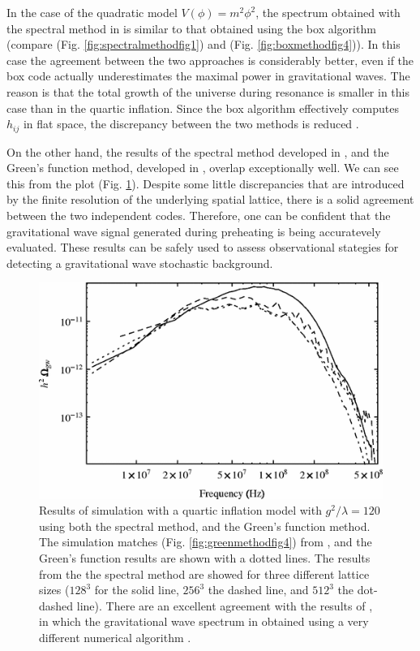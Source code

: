 \documentclass[11pt,a4paper,twoside]{book}
\begin{document}
 In the case of the quadratic model $ V(\phi)=m^{2}\phi^{2} $, the spectrum obtained with the spectral method in \cite{Chap7:SpectralMethod} is similar to that obtained using the box algorithm \cite{Chap7:BoxMethod} (compare (Fig. \ref{fig:spectralmethodfig1}) and (Fig. \ref{fig:boxmethodfig4})). In this case the agreement between the two approaches is considerably better, even if the box code actually underestimates the maximal power in gravitational waves. The reason is that the total growth of the universe during resonance is smaller in this case than in the quartic inflation. Since the box algorithm effectively computes $ h_{ij} $ in flat space, the discrepancy between the two methods is reduced \cite{Chap7:SpectralMethodComparison}.

On the other hand, the results of the spectral method developed in \cite{Chap7:SpectralMethod}, and the Green's function method, developed in \cite{Chap7:GreenMethod}, overlap exceptionally well. We can see this from the plot (Fig. \ref{fig:comparisonfig13}).  Despite some little discrepancies that are introduced by the finite resolution of the underlying spatial lattice, there is a solid agreement between the two independent codes. Therefore, one can be confident that the gravitational wave signal generated during preheating is being accuratevely evaluated. These results can be safely used to assess observational stategies for detecting a gravitational wave stochastic background.
 \begin{figure}[h]
 	\centering
 	\includegraphics[width=0.65\linewidth, height=0.35\textheight]{Images/Chap7/Comparison_Fig13}
 	\caption{Results of simulation with a quartic inflation model with $ g^{2}/\lambda=120 $ using both the spectral method, and the Green's function method. The simulation matches (Fig. \ref{fig:greenmethodfig4}) from \cite{Chap7:GreenMethod}, and the Green's function results are shown with a dotted lines. The results from the the spectral method are showed for three different lattice sizes ($ 128^{3} $ for the solid line, $ 256^{3} $ the dashed line, and $ 512^{3} $ the dot-dashed line). There are an excellent agreement with the results of \cite{Chap7:GreenMethod}, in which the gravitational wave spectrum in obtained using a very different numerical algorithm \cite{Chap7:SpectralMethodComparison}.}
 	\label{fig:comparisonfig13}
 \end{figure}
\end{document}
